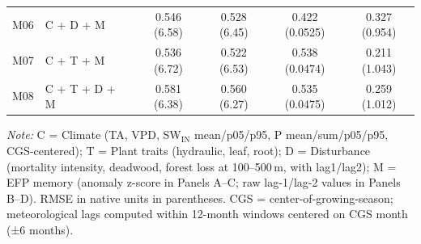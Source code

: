 \begin{table}[htbp]
\begin{tabular}{llccccc}
M06 & C + D + M &  & 0.546 (6.58) & 0.528 (6.45) & 0.422 (0.0525) & 0.327 (0.954) \\
M07 & C + T + M &  & 0.536 (6.72) & 0.522 (6.53) & 0.538 (0.0474) & 0.211 (1.043) \\
M08 & C + T + D + M &  & 0.581 (6.38) & 0.560 (6.27) & 0.535 (0.0475) & 0.259 (1.012) \\
\midrule
\bottomrule
\end{tabular}
\vspace{2pt}
\begin{minipage}{\linewidth}
\footnotesize
\textit{Note:} C = Climate (TA, VPD, SW$_\mathrm{IN}$ mean/p05/p95, P mean/sum/p05/p95, CGS-centered);
T = Plant traits (hydraulic, leaf, root);
D = Disturbance (mortality intensity, deadwood, forest loss at 100--500\,m, with lag1/lag2);
M = EFP memory (anomaly z-score in Panels A--C; raw lag-1/lag-2 values in Panels B--D).
RMSE in native units in parentheses. CGS = center-of-growing-season; meteorological lags computed
within 12-month windows centered on CGS month (±6 months).
\end{minipage}
\end{table}
